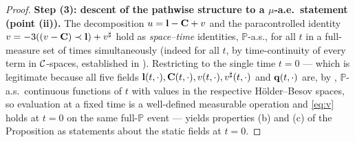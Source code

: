 \begin{proof}
\medskip
\textbf{Step (3): descent of the pathwise structure to a $\mu$-a.e.\ statement
(point (ii)).}
The decomposition $u=\mathbf{l}-\mathbf{C}+v$ and the paracontrolled identity
$v=-3((v-\mathbf{C})\prec\mathbf{l})+v^\sharp$ hold as \emph{space--time} identities,
$\mathbb P$-a.s., for all $t$ in a full-measure set of times simultaneously (indeed
for all $t$, by time-continuity of every term in $\mathcal{C}$-spaces, established in
\cite{EW24}). Restricting to the single time $t=0$ — which is legitimate because
all five fields $\mathbf{l}(t,\cdot),\mathbf{C}(t,\cdot),v(t,\cdot),v^\sharp(t,\cdot)$ and
$\mathbf{q}(t,\cdot)$ are, by \cite{HKN24,EW24}, $\mathbb P$-a.s.\ continuous functions
of $t$ with values in the respective H\"older--Besov spaces, so evaluation at a
fixed time is a well-defined measurable operation and \eqref{eq:v} holds at $t=0$
on the same full-$\mathbb P$ event — yields properties (b) and (c) of the
Proposition as statements about the static fields at $t=0$.


\end{proof}
